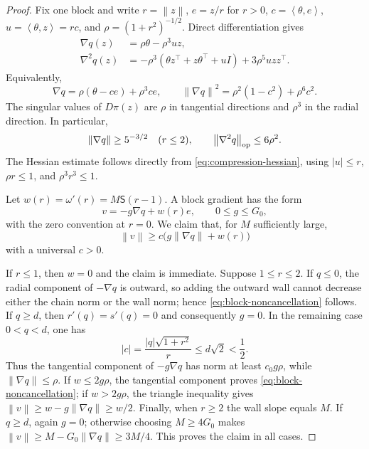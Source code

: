 \documentclass[11pt,a4paper]{article}
\newcommand{\norm}[1]{\left\lVert #1\right\rVert}
\newcommand{\inner}[2]{\left\langle #1,#2\right\rangle}
\theoremstyle{remark}
\begin{document}
\begin{proof}
Fix one block and write $r=\norm z$, $e=z/r$ for $r>0$,
$c=\inner\theta e$, $u=\inner\theta z=rc$, and
$\rho=(1+r^2)^{-1/2}$.  Direct differentiation gives
\begin{align}
 \nabla q(z)
 &=\rho\theta-\rho^3uz,
 \label{eq:compression-gradient}\\
 \nabla^2q(z)
 &=-\rho^3(\theta z^\top+z\theta^\top+uI)
   +3\rho^5u zz^\top.
 \label{eq:compression-hessian}
\end{align}
Equivalently,
\begin{equation}
 \nabla q
 =\rho(\theta-ce)+\rho^3ce,
 \qquad
 \norm{\nabla q}^2
 =\rho^2(1-c^2)+\rho^6c^2.
 \label{eq:compression-radial-tangent}
\end{equation}
The singular values of $D\pi(z)$ are $\rho$ in tangential directions and
$\rho^3$ in the radial direction.  In particular,
\begin{equation}
 \norm{\nabla q}\ge5^{-3/2}\quad(r\le2),
 \qquad
 \norm{\nabla^2q}_{\rm op}\le6\rho^2.
 \label{eq:compression-quantitative-bounds}
\end{equation}
The Hessian estimate follows directly from
\eqref{eq:compression-hessian}, using $|u|\le r$,
$\rho r\le1$, and $\rho^3r^3\le1$.

Let $w(r)=\omega'(r)=M\mathsf S(r-1)$.  A block gradient has the form
\begin{equation}
 v=-g\nabla q+w(r)e,
 \qquad 0\le g\le G_0,
 \label{eq:block-gradient-two-parts}
\end{equation}
with the zero convention at $r=0$.  We claim that, for $M$ sufficiently
large,
\begin{equation}
 \norm v\ge c\bigl(g\norm{\nabla q}+w(r)\bigr)
 \label{eq:block-noncancellation}
\end{equation}
with a universal $c>0$.

If $r\le1$, then $w=0$ and the claim is immediate.  Suppose
$1\le r\le2$.  If $q\le0$, the radial component of $-\nabla q$ is outward,
so adding the outward wall cannot decrease either the chain norm or the wall
norm; hence \eqref{eq:block-noncancellation} follows.  If $q\ge d$, then
$r'(q)=s'(q)=0$ and consequently $g=0$.  In the remaining case
$0<q<d$, one has
\[
 |c|=\frac{|q|\sqrt{1+r^2}}r\le d\sqrt2<\frac12.
\]
Thus the tangential component of $-g\nabla q$ has norm at least
$c_0g\rho$, while $\norm{\nabla q}\le\rho$.  If $w\le2g\rho$, the
tangential component proves \eqref{eq:block-noncancellation}; if
$w>2g\rho$, the triangle inequality gives
$\norm v\ge w-g\norm{\nabla q}\ge w/2$.  Finally, when $r\ge2$ the wall
slope equals $M$.  If $q\ge d$, again $g=0$; otherwise choosing
$M\ge4G_0$ makes
$\norm v\ge M-G_0\norm{\nabla q}\ge3M/4$.  This proves the claim in all
cases.


\end{proof}
\end{document}

